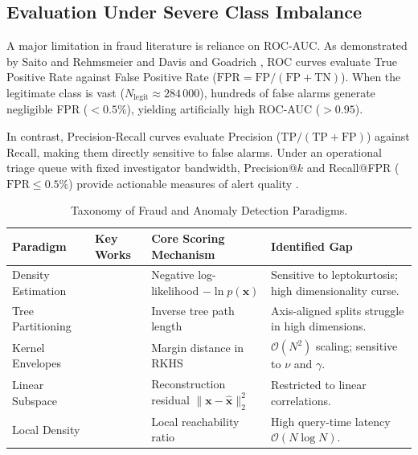\subsection{Evaluation Under Severe Class Imbalance}
A major limitation in fraud literature is reliance on ROC-AUC. As demonstrated by Saito and Rehmsmeier \cite{saito2015precision} and Davis and Goadrich \cite{davis2006relationship}, ROC curves evaluate True Positive Rate against False Positive Rate ($\text{FPR} = \text{FP}/(\text{FP}+\text{TN})$). When the legitimate class is vast ($N_{\text{legit}} \approx 284\,000$), hundreds of false alarms generate negligible FPR ($<0.5\%$), yielding artificially high ROC-AUC ($>0.95$).

In contrast, Precision-Recall curves evaluate Precision ($\text{TP}/(\text{TP}+\text{FP})$) against Recall, making them directly sensitive to false alarms. Under an operational triage queue with fixed investigator bandwidth, Precision@$k$ and Recall@FPR ($\text{FPR} \le 0.5\%$) provide actionable measures of alert quality \cite{dalpozzolo2018credit, leborgne2022handbook}.

\begin{table}[h]
\centering
\caption{Taxonomy of Fraud and Anomaly Detection Paradigms.}
\label{tab:lit_comparison}
\footnotesize
\begin{tabular}{lllp{2.6cm}}
\hline
\textbf{Paradigm} & \textbf{Key Works} & \textbf{Core Scoring Mechanism} & \textbf{Identified Gap} \\
\hline
Density Estimation & \cite{dempster1977maximum, akaike1974new, schwarz1978estimating} & Negative log-likelihood $-\ln p(\mathbf{x})$ & Sensitive to leptokurtosis; high dimensionality curse. \\
Tree Partitioning & \cite{liu2008isolation} & Inverse tree path length & Axis-aligned splits struggle in high dimensions. \\
Kernel Envelopes & \cite{scholkopf2001estimating} & Margin distance in RKHS & $\mathcal{O}(N^2)$ scaling; sensitive to $\nu$ and $\gamma$. \\
Linear Subspace & \cite{shyu2003novel} & Reconstruction residual $\|\mathbf{x} - \hat{\mathbf{x}}\|_2^2$ & Restricted to linear correlations. \\
Local Density & \cite{breunig2000lof} & Local reachability ratio & High query-time latency $\mathcal{O}(N \log N)$. \\
\hline
\end{tabular}
\end{table}
